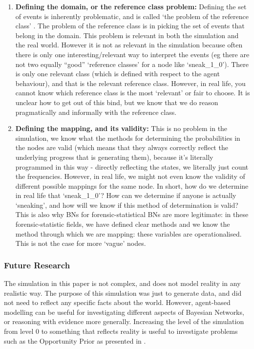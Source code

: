 \documentclass[11pt]{article}
\begin{document}
\begin{enumerate}
\begin{enumerate}
\item \textbf{Defining the domain, or the reference class problem:} Defining the set of events is inherently problematic, and is called `the problem of the reference class' \citep{colyvan2001}. The problem of the reference class is in picking the set of events that belong in the domain. This problem is relevant in both the simulation and the real world.  However it is not as relevant in the simulation because often there is only one interesting/relevant way to interpret the events (eg there are not two equally ``good'' `reference classes' for a node like `sneak\_1\_0'). There is only one relevant class (which is defined with respect to the agent behaviour), and that is the relevant reference class. However, in real life, you cannot know which reference class is the most `relevant' or fair to choose. It is unclear how to get out of this bind, but we know that we do reason pragmatically and informally with the reference class.
\item \textbf{Defining the mapping, and its validity:} This is no problem in the simulation, we know what the methods for determining the probabilities in the nodes are valid (which means that they always correctly reflect the underlying progress that is generating them), because it's literally programmed in this way - directly reflecting the states, we literally just count the frequencies. However, in real life, we might not even know the validity of different possible mappings for the same node. In short, how do we determine in real life that `sneak\_1\_0'? How can we determine if anyone is actually `sneaking', and how will we know if this method of determination is valid? This is also why BNs for forensic-statistical BNs are more legitimate: in these forensic-statistic fields, we have defined clear methods and we know the method through which we are mapping: these variables are operationalised. This is not the case for more `vague' nodes.
\end{enumerate}
\end{enumerate}

 
\subsubsection{Future Research}

The simulation in this paper is not complex, and does not model reality in any realistic way. The purpose of this simulation was just to generate data, and did not need to reflect any specific facts about the world. However, agent-based modelling can be useful for investigating different aspects of Bayesian Networks, or reasoning with evidence more generally. Increasing the level of the simulation from level 0 to something that reflects reality is useful to investigate problems such as the Opportunity Prior as presented in \citet{Fenton2017}. 




\end{document}
